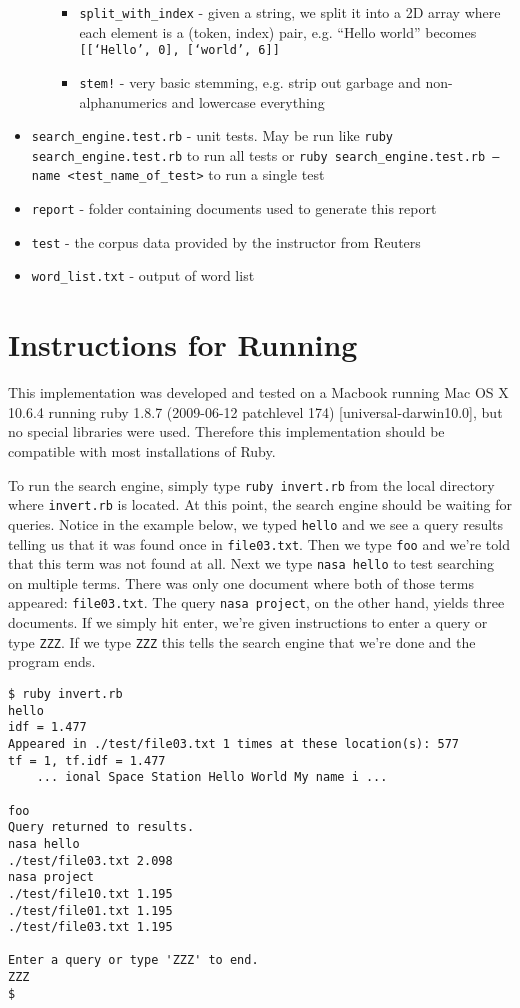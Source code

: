\documentclass[12pt]{article}
\begin{document}
\begin{itemize}
\begin{itemize}
      \begin{itemize}
        \item \texttt{split\_with\_index} - given a string, we split it into a 2D array where each element is a (token, index) pair, e.g. ``Hello world'' becomes \texttt{[[`Hello', 0], [`world', 6]]}
        \item \texttt{stem!} - very basic stemming, e.g. strip out garbage and non-alphanumerics and lowercase everything
      \end{itemize}
    \end{itemize}
  \item \texttt{search\_engine.test.rb} - unit tests. May be run like \texttt{ruby search\_engine.test.rb} to run all tests or \texttt{ruby search\_engine.test.rb --name <test\_name\_of\_test>} to run a single test
  \item \texttt{report} - folder containing documents used to generate this report
  \item \texttt{test} - the corpus data provided by the instructor from Reuters
  \item \texttt{word\_list.txt} - output of word list
\end{itemize}
\section{Instructions for Running} %
\label{sec:instructions_for_running}
This implementation was developed and tested on a Macbook running Mac OS X 10.6.4 running ruby 1.8.7 (2009-06-12 patchlevel 174) [universal-darwin10.0], but no special libraries were used. Therefore this implementation should be compatible with most installations of Ruby.

To run the search engine, simply type \texttt{ruby invert.rb} from the local directory where \texttt{invert.rb} is located. At this point, the search engine should be waiting for queries. Notice in the example below, we typed \texttt{hello} and we see a query results telling us that it was found once in \texttt{file03.txt}. Then we type \texttt{foo} and we're told that this term was not found at all. Next we type \texttt{nasa hello} to test searching on multiple terms. There was only one document where both of those terms appeared: \texttt{file03.txt}. The query \texttt{nasa project}, on the other hand, yields three documents. If we simply hit enter, we're given instructions to enter a query or type \texttt{ZZZ}. If we type \texttt{ZZZ} this tells the search engine that we're done and the program ends.
\pagebreak
\lstset{caption=Sample interaction with the search engine.}
\begin{lstlisting}
$ ruby invert.rb 
hello
idf = 1.477
Appeared in ./test/file03.txt 1 times at these location(s): 577
tf = 1, tf.idf = 1.477
	... ional Space Station Hello World My name i ...

foo
Query returned to results.
nasa hello
./test/file03.txt 2.098
nasa project
./test/file10.txt 1.195
./test/file01.txt 1.195
./test/file03.txt 1.195

Enter a query or type 'ZZZ' to end.
ZZZ
$   
\end{lstlisting}
\end{document}
